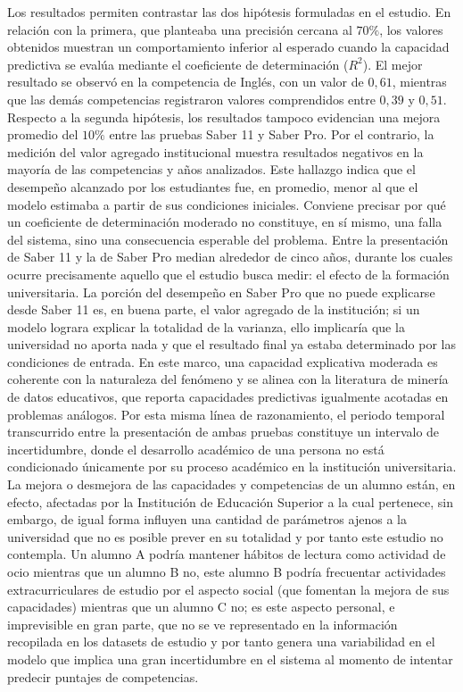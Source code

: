 Los resultados permiten contrastar las dos hipótesis formuladas en el estudio. En relación con la primera, que planteaba una precisión cercana al $70\%$, los valores obtenidos muestran un comportamiento inferior al esperado cuando la capacidad predictiva se evalúa mediante el coeficiente de determinación ($R^2$). El mejor resultado se observó en la competencia de Inglés, con un valor de $0,61$, mientras que las demás competencias registraron valores comprendidos entre $0,39$ y $0,51$. Respecto a la segunda hipótesis, los resultados tampoco evidencian una mejora promedio del $10\%$ entre las pruebas Saber 11 y Saber Pro. Por el contrario, la medición del valor agregado institucional muestra resultados negativos en la mayoría de las competencias y años analizados. Este hallazgo indica que el desempeño alcanzado por los estudiantes fue, en promedio, menor al que el modelo estimaba a partir de sus condiciones iniciales.
Conviene precisar por qué un coeficiente de determinación moderado no constituye, en sí mismo, una falla del sistema, sino una consecuencia esperable del problema. Entre la presentación de Saber 11 y la de Saber Pro median alrededor de cinco años, durante los cuales ocurre precisamente aquello que el estudio busca medir: el efecto de la formación universitaria. La porción del desempeño en Saber Pro que no puede explicarse desde Saber 11 es, en buena parte, el valor agregado de la institución; si un modelo lograra explicar la totalidad de la varianza, ello implicaría que la universidad no aporta nada y que el resultado final ya estaba determinado por las condiciones de entrada. En este marco, una capacidad explicativa moderada es coherente con la naturaleza del fenómeno y se alinea con la literatura de minería de datos educativos, que reporta capacidades predictivas igualmente acotadas en problemas análogos.
Por esta misma línea de razonamiento, el periodo temporal transcurrido entre la presentación de ambas pruebas constituye un intervalo de incertidumbre, donde el desarrollo académico de una persona no está condicionado únicamente por su proceso académico en la institución universitaria. La mejora o desmejora de las capacidades y competencias de un alumno están, en efecto, afectadas por la Institución de Educación Superior a la cual pertenece, sin embargo, de igual forma influyen una cantidad de parámetros ajenos a la universidad que no es posible prever en su totalidad y por tanto este estudio no contempla. Un alumno A podría mantener hábitos de lectura como actividad de ocio mientras que un alumno B no, este alumno B podría frecuentar actividades extracurriculares de estudio por el aspecto social (que fomentan la mejora de sus capacidades) mientras que un alumno C no; es este aspecto personal, e imprevisible en gran parte, que no se ve representado en la información recopilada en los datasets de estudio y por tanto genera una variabilidad en el modelo que implica una gran incertidumbre en el sistema al momento de intentar predecir puntajes de competencias.
